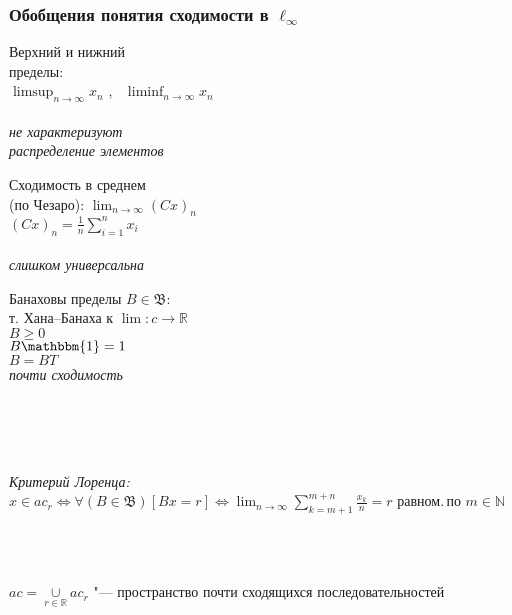 \begin{frame}\frametitle{Обобщения понятия сходимости в $\ell_\infty$}
	\begin{varwidth}[t]{\linewidth}
		\centering
		Верхний и нижний
		\\
		пределы:
		\\
		$\displaystyle \limsup_{n\to\infty} x_n$
		,~
		$\displaystyle \liminf_{n\to\infty} x_n$
		\\~\\
		\emph{
			не характеризуют
			\\
			распределение элементов
		}
	\end{varwidth}
	\hfill
	\begin{varwidth}[t]{\linewidth}
		\centering
		Сходимость в среднем
		\\
		(по Чезаро):
		$\displaystyle \lim_{n\to\infty} (Cx)_n$
		\\
		$\displaystyle (Cx)_n = \frac1n\sum_{i=1}^n x_i$
		\\~\\
		\emph{слишком универсальна}
	\end{varwidth}
	\hfill
	\begin{varwidth}[t]{\linewidth}
		\centering
		Банаховы пределы $B\in \mathfrak{B}$:
		\\
		т. Хана--Банаха к $\lim: c\to\mathbb R$
		\\
			$B \geqslant 0$
		\\
			$B\mathbbm{1} = 1$
		\\
			$B=BT$
		\\
		\emph{почти сходимость}
	\end{varwidth}
	\\~\\~\\
	\begin{varwidth}[t]{\linewidth}
		\centering
		\emph{Критерий Лоренца:}
		$\displaystyle
			x\in ac_r
			\Leftrightarrow
			\forall(B\in\mathfrak{B})[Bx = r]
			\Leftrightarrow
			\!
			\lim_{n\to\infty}  \sum_{k=m+1}^{m+n} \frac{x_k}n = r
		$
		равном.\,по $m\in\mathbb{N}$
	\end{varwidth}
	\\~\\
	\vspace{0.8em}
	\begin{varwidth}[t]{\linewidth}
		$\displaystyle ac = \mathop{\cup}\limits_{r\in\mathbb R} ac_r$ "--- пространство почти сходящихся последовательностей
	\end{varwidth}
\end{frame}


